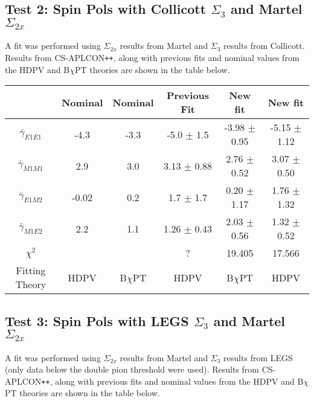 \documentclass[]{article}
\begin{document}
\subsection{Test 2: Spin Pols with Collicott $\Sigma_{3}$ and Martel $\Sigma_{2x}$}\label{Section:CollicottTest}

A fit was performed using $\Sigma_{2x}$ results from Martel and $\Sigma_{3}$ results from Collicott. Results from CS-APLCON\texttt{++}, along with previous fits and nominal values from the HDPV and B$\chi$PT theories are shown in the table below.

\begin{table}[h!]
	\centering %
	\begin{tabular}{|c|cc|c|c|c|} %
		\hline
		& Nominal & Nominal & Previous Fit & New fit & New fit\\
		\hline %
		$\bar{\gamma}_{E1E1}$ & -4.3 & -3.3 & -5.0 $\pm$ 1.5  & -3.98 $\pm$ 0.95 & -5.15 $\pm$ 1.12 \\ 
		$\bar{\gamma}_{M1M1}$ & 2.9 & 3.0   & 3.13 $\pm$ 0.88 &  2.76 $\pm$ 0.52 & 3.07 $\pm$ 0.50\\
		$\bar{\gamma}_{E1M2}$ & -0.02 & 0.2 & 1.7 $\pm$ 1.7   &  0.20 $\pm$ 1.17 & 1.76 $\pm$ 1.32\\
		$\bar{\gamma}_{M1E2}$ & 2.2 & 1.1   & 1.26 $\pm$ 0.43 &  2.03 $\pm$ 0.56 & 1.32 $\pm$ 0.52\\[0.5ex]
				$\chi^{2}$    &     &       &  ?              & 19.405 & 17.566 \\[0.5ex]		
		\hline
		Fitting Theory & HDPV & B$\chi$PT & HDPV & B$\chi$PT& HDPV\\
		\hline
	\end{tabular}
\end{table}

\subsection{Test 3: Spin Pols with LEGS $\Sigma_{3}$ and Martel $\Sigma_{2x}$}\label{Section:LEGSTest}

A fit was performed using $\Sigma_{2x}$ results from Martel and $\Sigma_{3}$ results from LEGS (only data below the double pion threshold were used). Results from CS-APLCON\texttt{++}, along with previous fits and nominal values from the HDPV and B$\chi$PT theories are shown in the table below.
\end{document}
